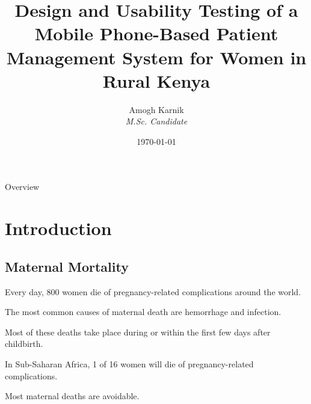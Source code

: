 \documentclass[xcolor=x11names,compress]{beamer}
\renewcommand{\(}{\begin{columns}}
\renewcommand{\)}{\end{columns}}
\newcommand{\<}[1]{\begin{column}{#1}}
\renewcommand{\>}{\end{column}}
\begin{document}
\title{Design and Usability Testing of a Mobile Phone-Based Patient Management System for Women in Rural Kenya}
\author[Amogh Karnik]{
	Amogh Karnik\\
	{\it M.Sc. Candidate}\\
}
\date{\today}

\begin{frame}
\titlepage
\end{frame}

\begin{frame}{Overview}
\tableofcontents
\end{frame}


\section{Introduction}
\subsection{Maternal Mortality}

\begin{frame}

\begin{alertblock}{Every day, 800 women die of pregnancy-related complications around the world.}

\end{alertblock}
\pause
\begin{alertblock}{The most common causes of maternal death are hemorrhage and infection.}
\end{alertblock}
\pause
\begin{alertblock}{Most of these deaths take place during or within the first few days after childbirth.}
\end{alertblock}
\pause
\begin{alertblock}{In Sub-Saharan Africa, 1 of 16 women will die of pregnancy-related complications.}
\end{alertblock}
\end{frame}


\begin{frame}
\begin{center}
Most maternal deaths are avoidable.
\end{center}
\end{frame}
\end{document}
